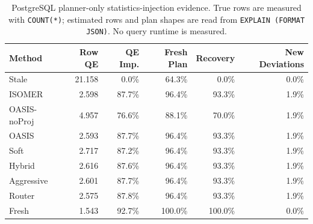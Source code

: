 \begin{table}[t]
  \centering
  \small
  \caption{PostgreSQL planner-only statistics-injection evidence. True rows are measured with \texttt{COUNT(*)}; estimated rows and plan shapes are read from \texttt{EXPLAIN (FORMAT JSON)}. No query runtime is measured.}
  \label{tab:postgres_planner_stats_injection}
  \setlength{\tabcolsep}{4pt}
  \begin{tabular}{lrrrrr}
    \toprule
    Method & Row QE & QE Imp. & Fresh Plan & Recovery & New Deviations \\
    \midrule
    Stale & 21.158 & 0.0\% & 64.3\% & 0.0\% & 0.0\% \\
    ISOMER & 2.598 & 87.7\% & 96.4\% & 93.3\% & 1.9\% \\
    OASIS-noProj & 4.957 & 76.6\% & 88.1\% & 70.0\% & 1.9\% \\
    OASIS & 2.593 & 87.7\% & 96.4\% & 93.3\% & 1.9\% \\
    Soft & 2.717 & 87.2\% & 96.4\% & 93.3\% & 1.9\% \\
    Hybrid & 2.616 & 87.6\% & 96.4\% & 93.3\% & 1.9\% \\
    Aggressive & 2.601 & 87.7\% & 96.4\% & 93.3\% & 1.9\% \\
    Router & 2.575 & 87.8\% & 96.4\% & 93.3\% & 1.9\% \\
    Fresh & 1.543 & 92.7\% & 100.0\% & 100.0\% & 0.0\% \\
    \bottomrule
  \end{tabular}
\end{table}
